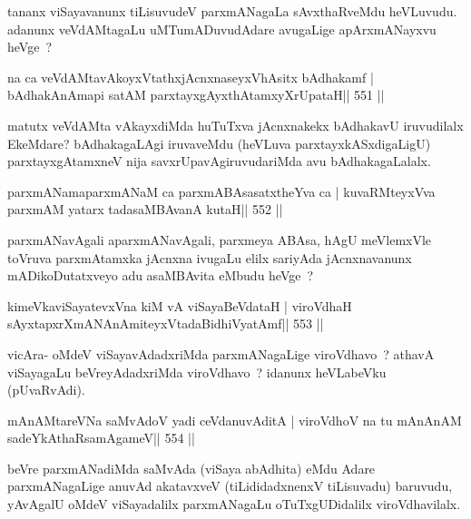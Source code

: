 \begin{artha}
tananx viSayavanunx tiLisuvudeV parxmANagaLa sAvxthaRveMdu heVLuvudu.
adanunx veVdAMtagaLu uMTumADuvudAdare avugaLige apArxmANayxvu heVge~?
\end{artha}

\begin{shl}
na ca veVdAMtavAkoyxVtathxjAcnxnaseyxVhAsitx bAdhakamf |
bAdhakAnAmapi satAM parxtayxgAyxthAtamxyXrUpataH\hfill || 551 ||
\end{shl}

\begin{artha}
matutx veVdAMta vAkayxdiMda huTuTxva jAcnxnakekx bAdhakavU iruvudilalx EkeMdare? bAdhakagaLAgi iruvaveMdu (heVLuva parxtayxkASxdigaLigU) parxtayxgAtamxneV nija savxrUpavAgiruvudariMda avu bAdhakagaLalalx.
\end{artha}

\begin{shl}
parxmANamaparxmANaM ca parxmABAsasatxtheYva ca |
kuvaRMteyxVva parxmAM yatarx tadasaMBAvanA kutaH\hfill || 552 ||
\end{shl}

\begin{artha}
parxmANavAgali aparxmANavAgali, parxmeya ABAsa, hAgU meVlemxVle
toVruva parxmAtamxka jAcnxna ivugaLu elilx sariyAda jAcnxnavanunx
mADikoDutatxveyo adu asaMBAvita eMbudu heVge~? 
\end{artha}

\begin{shl}
kimeVkaviSayatevxVna kiM vA viSayaBeVdataH |
viroVdhaH sAyxtapxrXmANAnAmiteyxVtadaBidhiVyatAmf\hfill || 553 ||
\end{shl}

\begin{artha}
vicAra- oMdeV viSayavAdadxriMda parxmANagaLige viroVdhavo~? athavA viSayagaLu beVreyAdadxriMda viroVdhavo~? idanunx heVLabeVku (pUvaRvAdi).
\end{artha}


\begin{shl}
mAnAMtareVNa saMvAdoV yadi ceVdanuvAditA |
viroVdhoV na tu mAnAnAM sadeYkAthaRsamAgameV\hfill || 554 ||
\end{shl}

\begin{artha}
beVre parxmANadiMda saMvAda (viSaya abAdhita) eMdu Adare parxmANagaLige anuvAd	akatavxveV (tiLididadxnenxV tiLisuvadu) baruvudu, yAvAgalU oMdeV viSayadalilx parxmANagaLu oTuTxgUDidalilx viroVdhavilalx.
\end{artha}

